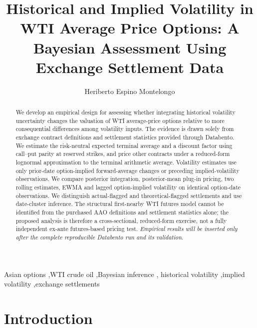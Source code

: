 \documentclass[a4paper,fleqn]{cas-dc}
\begin{document}
\let\WriteBookmarks\relax
{}
\title[mode=title]{Historical and Implied Volatility in WTI Average Price Options:
A Bayesian Assessment Using Exchange Settlement Data}
\author[1]{Heriberto Espino Montelongo}

\begin{abstract}
We develop an empirical design for assessing whether integrating historical
volatility uncertainty changes the valuation of WTI average-price options
relative to more consequential differences among volatility inputs.
The evidence is drawn solely from exchange contract definitions and
settlement statistics provided through Databento. We estimate the
risk-neutral expected terminal average and a discount factor using
call--put parity at reserved strikes, and price other contracts under
a reduced-form lognormal approximation to the terminal arithmetic
average. Volatility estimates use only prior-date option-implied
forward-average changes or preceding implied-volatility observations.
We compare posterior integration, posterior-mean plug-in pricing,
two rolling estimates, EWMA and lagged option-implied volatility on
identical option-date observations. We distinguish actual-flagged
and theoretical-flagged settlements and use date-cluster inference.
The structural first-nearby WTI futures model cannot be identified
from the purchased AAO definitions and settlement statistics alone;
the proposed analysis is therefore a cross-sectional, reduced-form
exercise, not a fully independent ex-ante futures-based pricing test.
\textit{Empirical results will be inserted only after the complete
reproducible Databento run and its validation.}
\end{abstract}

\begin{keywords}
Asian options \sep WTI crude oil \sep Bayesian inference \sep
historical volatility \sep implied volatility \sep exchange settlements
\end{keywords}
\maketitle

\section{Introduction}
\label{sec:db_intro}
\end{document}
